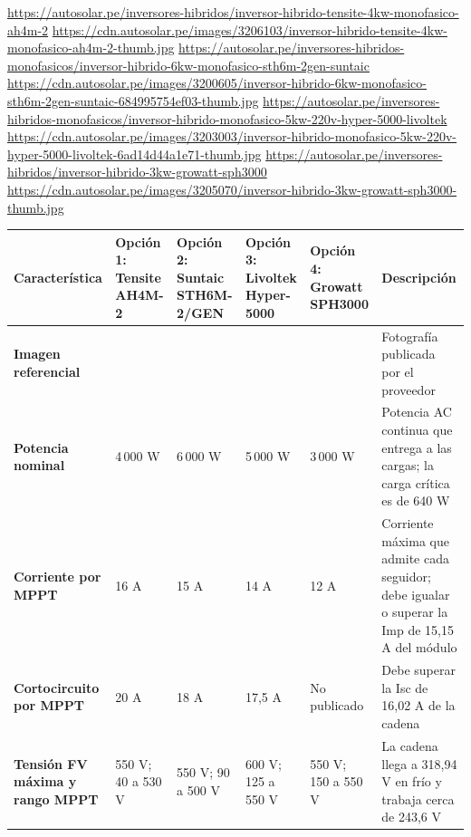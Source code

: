\begin{landscape}
\urldef{\cotua}\url{https://autosolar.pe/inversores-hibridos/inversor-hibrido-tensite-4kw-monofasico-ah4m-2}
\urldef{\cotub}\url{https://cdn.autosolar.pe/images/3206103/inversor-hibrido-tensite-4kw-monofasico-ah4m-2-thumb.jpg}
\urldef{\cotuc}\url{https://autosolar.pe/inversores-hibridos-monofasicos/inversor-hibrido-6kw-monofasico-sth6m-2gen-suntaic}
\urldef{\cotud}\url{https://cdn.autosolar.pe/images/3200605/inversor-hibrido-6kw-monofasico-sth6m-2gen-suntaic-684995754ef03-thumb.jpg}
\urldef{\cotue}\url{https://autosolar.pe/inversores-hibridos-monofasicos/inversor-hibrido-monofasico-5kw-220v-hyper-5000-livoltek}
\urldef{\cotuf}\url{https://cdn.autosolar.pe/images/3203003/inversor-hibrido-monofasico-5kw-220v-hyper-5000-livoltek-6ad14d44a1e71-thumb.jpg}
\urldef{\cotug}\url{https://autosolar.pe/inversores-hibridos/inversor-hibrido-3kw-growatt-sph3000}
\urldef{\cotuh}\url{https://cdn.autosolar.pe/images/3205070/inversor-hibrido-3kw-growatt-sph3000-thumb.jpg}
\par\noindent\begin{minipage}{\linewidth}\formatofichas\scriptsize\renewcommand{\arraystretch}{1.0}
\label{tab:cot-inv}
\begin{tabularx}{\linewidth}{@{}>{\raggedright\arraybackslash}p{3.0cm}YYYY>{\raggedright\arraybackslash}p{4.4cm}@{}}
\toprule
\textbf{Característica} & \textbf{Opción 1: Tensite AH4M-2} & \textbf{Opción 2: Suntaic STH6M-2/GEN} & \textbf{Opción 3: Livoltek Hyper-5000} & \textbf{Opción 4: Growatt SPH3000} & \textbf{Descripción}\\\midrule
\textbf{Imagen referencial} &  &  &  &  & Fotografía publicada por el proveedor\\
\textbf{Potencia nominal} & 4\,000 W & 6\,000 W & 5\,000 W & 3\,000 W & Potencia AC continua que entrega a las cargas; la carga crítica es de 640 W\\
\textbf{Corriente por MPPT} & 16 A & 15 A & 14 A & 12 A & Corriente máxima que admite cada seguidor; debe igualar o superar la Imp de 15,15 A del módulo\\
\textbf{Cortocircuito por MPPT} & 20 A & 18 A & 17,5 A & No publicado & Debe superar la Isc de 16,02 A de la cadena\\
\textbf{Tensión FV máxima y rango MPPT} & 550 V; 40 a 530 V & 550 V; 90 a 500 V & 600 V; 125 a 550 V & 550 V; 150 a 550 V & La cadena llega a 318,94 V en frío y trabaja cerca de 243,6 V\\

\end{tabularx}
\end{minipage}
\end{landscape}
